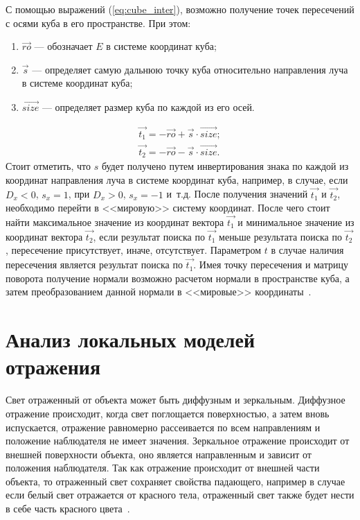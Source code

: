 С помощью выражений (\ref{eq:cube_inter}), возможно получение 
точек пересечений с осями куба в его пространстве.
При этом:
\begin{enumerate}
	\item $\vec{ro}$ --- обозначает $E$ в системе координат куба;
	\item $\vec{s}$ --- определяет самую дальнюю точку куба относительно направления луча в системе координат куба;
	\item $\vec{size}$ --- определяет размер куба по каждой из его осей.
\end{enumerate}

\begin{equation}
	\begin{aligned}
		\vec{t_{1}} = -\vec{ro} + \vec{s} \cdot \vec{size};\\
		\vec{t_{2}} = -\vec{ro} - \vec{s} \cdot \vec{size}.
	\end{aligned}
	\label{eq:cube_inter}
\end{equation}
Стоит отметить, что $s$ будет получено  путем инвертирования знака по каждой из координат направления луча  в системе координат куба, например, в случае, если $D_{x} < 0$, $s_{x} = 1$, при $D_{x} > 0$, $s_{x} = -1$ и~т.д. После получения значений $\vec{t_{1}}$ и $\vec{t_{2}}$, необходимо перейти в <<мировую>> систему координат.
После чего стоит найти максимальное значение из координат вектора $\vec{t_{1}}$ и минимальное значение из координат вектора $\vec{t_{2}}$, если результат поиска по $\vec{t_{1}}$ меньше результата поиска по $\vec{t_{2}}$, пересечение присутствует, иначе, отсутствует. Параметром $t$ в случае наличия пересечения является результат поиска по $\vec{t_{1}}$. Имея точку пересечения  и матрицу поворота получение нормали возможно расчетом нормали в пространстве куба, а затем преобразованием данной нормали в <<мировые>> координаты~\cite{cubeInter}.



\section{Анализ локальных моделей отражения}
\label{sec:reflection_models}
Свет отраженный от объекта может быть диффузным и зеркальным.
Диффузное отражение происходит, когда свет поглощается поверхностью, а затем вновь испускается, 
отражение равномерно рассеивается по всем направлениям и положение наблюдателя не имеет значения. Зеркальное отражение
происходит от внешней поверхности объекта, оно является направленным и зависит от положения наблюдателя.
Так как отражение происходит от внешней части объекта, то отраженный свет сохраняет свойства падающего, например в случае если белый свет отражается
от красного тела, отраженный свет также будет нести в себе часть красного цвета~\cite{Rodgers}.

